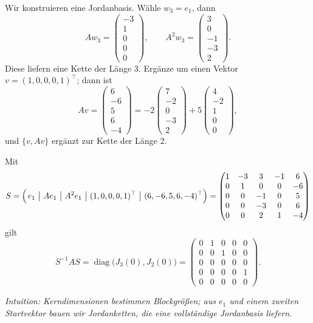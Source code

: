 \documentclass[11pt, a4paper]{article}
\begin{document}
\begin{framed}
Wir konstruieren eine Jordanbasis. Wähle $w_3=e_1$, dann
\[
A w_3=\begin{pmatrix}-3\\1\\0\\0\\0\end{pmatrix},\qquad
A^2 w_3=\begin{pmatrix}3\\0\\-1\\-3\\2\end{pmatrix}.
\]
Diese liefern eine Kette der Länge $3$. Ergänze um einen Vektor $v=(1,0,0,0,1)^{\top}$;
dann ist
\[
A v=\begin{pmatrix}6\\-6\\5\\6\\-4\end{pmatrix}
=-2\begin{pmatrix}7\\-2\\0\\-3\\2\end{pmatrix}
+5\begin{pmatrix}4\\-2\\1\\0\\0\end{pmatrix},
\]
und $\{v,Av\}$ ergänzt zur Kette der Länge $2$.

Mit
\[
S=\Bigl(\,e_1\ \big|\ A e_1\ \big|\ A^2 e_1\ \big|\ (1,0,0,0,1)^{\top}\ \big|\ (6,-6,5,6,-4)^{\top}\Bigr)
=
\begin{pmatrix}
1&-3&3&-1&6\\
0& 1&0& 0&-6\\
0& 0&-1&0& 5\\
0& 0&-3&0& 6\\
0& 0& 2&1&-4
\end{pmatrix}
\]
gilt
\[
S^{-1}AS=
\operatorname{diag}\!\big(J_3(0),J_2(0)\big)
=
\begin{pmatrix}
0&1&0&0&0\\
0&0&1&0&0\\
0&0&0&0&0\\
0&0&0&0&1\\
0&0&0&0&0
\end{pmatrix}.
\]

\medskip\noindent\textit{Intuition: Kerndimensionen bestimmen Blockgrößen; aus $e_1$ und einem zweiten Startvektor bauen wir Jordan\-ketten, die eine vollständige Jordanbasis liefern.}
\end{framed}
\end{document}
